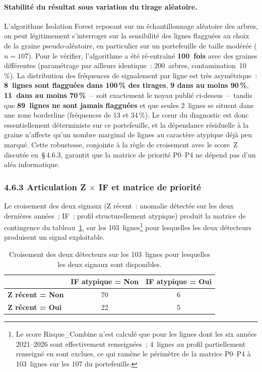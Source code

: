 \paragraph{Stabilit\'e du r\'esultat sous variation du tirage al\'eatoire.}
L'algorithme Isolation Forest reposant sur un \'echantillonnage al\'eatoire
des arbres, on peut l\'egitimement s'interroger sur la sensibilit\'e des
lignes flaggu\'ees au choix de la graine pseudo-al\'eatoire, en particulier
sur un portefeuille de taille mod\'er\'ee ($n=107$). Pour le v\'erifier,
l'algorithme a \'et\'e r\'e-entra\^in\'e \textbf{100~fois} avec des graines
diff\'erentes (param\'etrage par ailleurs identique~: 200~arbres,
contamination~10\,\%). La distribution des fr\'equences de signalement par
ligne est tr\`es asym\'etrique~: \textbf{8~lignes sont flaggu\'ees dans
100\,\% des tirages}, \textbf{9 dans au moins 90\,\%}, \textbf{11~dans au
moins 70\,\%}~--~soit exactement le noyau publi\'e ci-dessus~--~tandis que
\textbf{89~lignes ne sont jamais flaggu\'ees} et que seules 2~lignes se
situent dans une zone \og borderline \fg{} (fr\'equences de 13 et 34\,\%).
Le c\oe ur du diagnostic est donc essentiellement d\'eterministe sur ce
portefeuille, et la d\'ependance r\'esiduelle \`a la graine n'affecte qu'un
nombre marginal de lignes au caract\`ere atypique d\'ej\`a peu marqu\'e.
Cette robustesse, conjointe \`a la r\`egle de croisement avec le score~Z
discut\'ee en~\S\,4.6.3, garantit que la matrice de priorit\'e P0--P4 ne
d\'epend pas d'un al\'ea informatique.

\subsubsection*{4.6.3 \quad Articulation Z $\times$ IF et matrice de priorit\'e}

Le croisement des deux signaux (Z r\'ecent~: anomalie d\'etect\'ee sur les
deux derni\`eres ann\'ees~; IF~: profil structurellement atypique) produit la
matrice de contingence du tableau~\ref{tab:z-if-cross}, sur les
103~lignes\footnote{Le score Risque\_Combine n'est calcul\'e que pour les
lignes dont les six ann\'ees 2021--2026 sont effectivement renseign\'ees~;
4~lignes au profil partiellement renseign\'e en sont exclues, ce qui ram\`ene
le p\'erim\`etre de la matrice P0--P4 \`a 103~lignes sur les 107 du
portefeuille.} pour lesquelles les deux d\'etecteurs produisent un signal
exploitable.

\begin{table}[h]
\centering
\caption{Croisement des deux d\'etecteurs sur les 103~lignes pour lesquelles les deux signaux sont disponibles.}
\label{tab:z-if-cross}
\begin{tabular}{lcc}
\toprule
 & \textbf{IF atypique = Non} & \textbf{IF atypique = Oui} \\
\midrule
\textbf{Z r\'ecent = Non} & 70 & 6 \\
\textbf{Z r\'ecent = Oui} & 22 & 5 \\
\bottomrule
\end{tabular}
\end{table}

